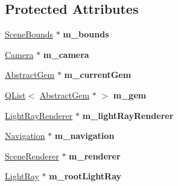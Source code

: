 \subsection*{Protected Attributes}
\begin{DoxyCompactItemize}
\item 
\hypertarget{class_scene_a62831eb6a67ce74ee608b4327bf069f3}{}\hyperlink{class_scene_bounds}{Scene\+Bounds} $\ast$ {\bfseries m\+\_\+bounds}\label{class_scene_a62831eb6a67ce74ee608b4327bf069f3}

\item 
\hypertarget{class_scene_ab37f5e133a5fe0803c3df42a4fcba7bf}{}\hyperlink{class_camera}{Camera} $\ast$ {\bfseries m\+\_\+camera}\label{class_scene_ab37f5e133a5fe0803c3df42a4fcba7bf}

\item 
\hypertarget{class_scene_aff9d5a2212ba1b5813dc10177f0344cb}{}\hyperlink{class_abstract_gem}{Abstract\+Gem} $\ast$ {\bfseries m\+\_\+current\+Gem}\label{class_scene_aff9d5a2212ba1b5813dc10177f0344cb}

\item 
\hypertarget{class_scene_a4865a91dd0d6d9af51a7e5cb74d9c991}{}\hyperlink{class_q_list}{Q\+List}$<$ \hyperlink{class_abstract_gem}{Abstract\+Gem} $\ast$ $>$ {\bfseries m\+\_\+gem}\label{class_scene_a4865a91dd0d6d9af51a7e5cb74d9c991}

\item 
\hypertarget{class_scene_ab06de12f271bb51852aedf06285b1032}{}\hyperlink{class_light_ray_renderer}{Light\+Ray\+Renderer} $\ast$ {\bfseries m\+\_\+light\+Ray\+Renderer}\label{class_scene_ab06de12f271bb51852aedf06285b1032}

\item 
\hypertarget{class_scene_a595ab554271bd87c4c73f0cce175ff81}{}\hyperlink{class_navigation}{Navigation} $\ast$ {\bfseries m\+\_\+navigation}\label{class_scene_a595ab554271bd87c4c73f0cce175ff81}

\item 
\hypertarget{class_scene_aa7040eec94173f3ca255a35f926fad6f}{}\hyperlink{class_scene_renderer}{Scene\+Renderer} $\ast$ {\bfseries m\+\_\+renderer}\label{class_scene_aa7040eec94173f3ca255a35f926fad6f}

\item 
\hypertarget{class_scene_a766daf7b6a92c877f1fc57f3d8af9959}{}\hyperlink{class_light_ray}{Light\+Ray} $\ast$ {\bfseries m\+\_\+root\+Light\+Ray}\label{class_scene_a766daf7b6a92c877f1fc57f3d8af9959}

\end{DoxyCompactItemize}

